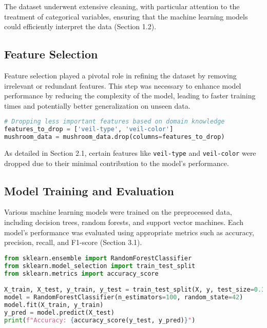 \documentclass{article}
\begin{document}
The dataset underwent extensive cleaning, with particular attention to the treatment of categorical variables, ensuring that the machine learning models could efficiently interpret the data (Section 1.2).

\subsection{Feature Selection}

Feature selection played a pivotal role in refining the dataset by removing irrelevant or redundant features. This step was necessary to enhance model performance by reducing the complexity of the model, leading to faster training times and potentially better generalization on unseen data.

\begin{lstlisting}[language=Python, caption=Feature Selection Process, label=code:feature_selection]
# Dropping less important features based on domain knowledge
features_to_drop = ['veil-type', 'veil-color']
mushroom_data = mushroom_data.drop(columns=features_to_drop)
\end{lstlisting}

As detailed in Section 2.1, certain features like \texttt{veil-type} and \texttt{veil-color} were dropped due to their minimal contribution to the model's performance.

\subsection{Model Training and Evaluation}

Various machine learning models were trained on the preprocessed data, including decision trees, random forests, and support vector machines. Each model's performance was evaluated using appropriate metrics such as accuracy, precision, recall, and F1-score (Section 3.1).

\begin{lstlisting}[language=Python, caption=Training a Random Forest Model, label=code:random_forest]
from sklearn.ensemble import RandomForestClassifier
from sklearn.model_selection import train_test_split
from sklearn.metrics import accuracy_score

X_train, X_test, y_train, y_test = train_test_split(X, y, test_size=0.3, random_state=42)
model = RandomForestClassifier(n_estimators=100, random_state=42)
model.fit(X_train, y_train)
y_pred = model.predict(X_test)
print(f"Accuracy: {accuracy_score(y_test, y_pred)}")
\end{lstlisting}
\end{document}
